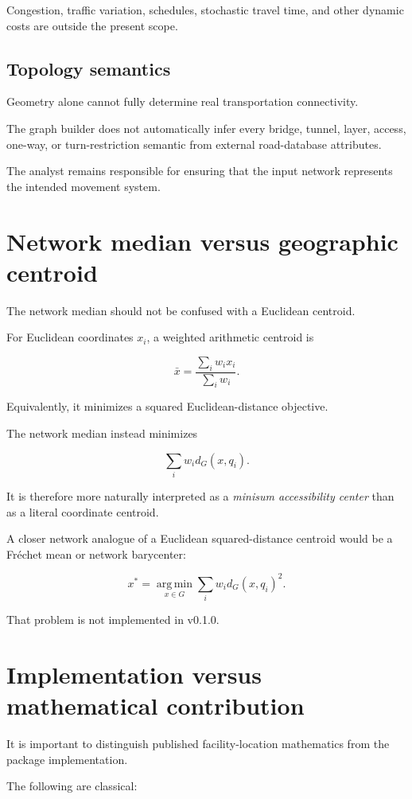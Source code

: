\documentclass[11pt]{article}
\newcommand{\argmin}{\operatorname*{arg\,min}}
\begin{document}
Congestion, traffic variation, schedules, stochastic travel time, and other
dynamic costs are outside the present scope.

\subsection{Topology semantics}

Geometry alone cannot fully determine real transportation connectivity.

The graph builder does not automatically infer every bridge, tunnel, layer,
access, one-way, or turn-restriction semantic from external road-database
attributes.

The analyst remains responsible for ensuring that the input network represents
the intended movement system.

\section{Network median versus geographic centroid}

The network median should not be confused with a Euclidean centroid.

For Euclidean coordinates \(x_i\), a weighted arithmetic centroid is

\[
\bar{x}
=
\frac{\sum_i w_i x_i}
{\sum_i w_i}.
\]

Equivalently, it minimizes a squared Euclidean-distance objective.

The network median instead minimizes

\[
\sum_i w_i d_G(x,q_i).
\]

It is therefore more naturally interpreted as a \emph{minisum accessibility
center} than as a literal coordinate centroid.

A closer network analogue of a Euclidean squared-distance centroid would be a
Fr\'echet mean or network barycenter:

\[
x^*
=
\argmin_{x\in G}
\sum_i w_i d_G(x,q_i)^2.
\]

That problem is not implemented in v0.1.0.

\section{Implementation versus mathematical contribution}

It is important to distinguish published facility-location mathematics from the
package implementation.

The following are classical:
\end{document}
